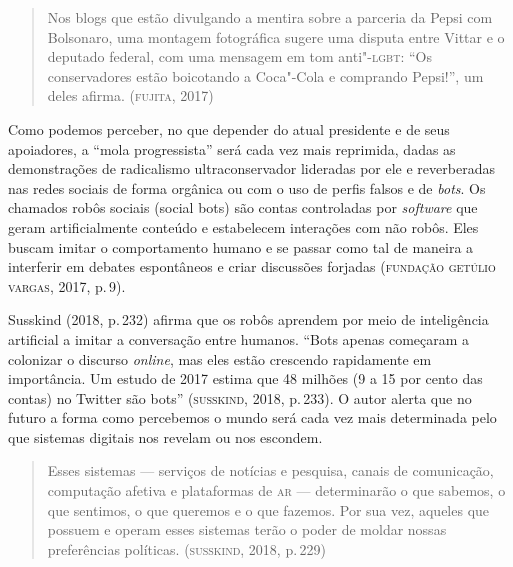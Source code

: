 \begin{quote}
Nos blogs que estão divulgando a mentira sobre a parceria da Pepsi com
Bolsonaro, uma montagem fotográfica sugere uma disputa entre Vittar e o
deputado federal, com uma mensagem em tom anti"-\textsc{lgbt}: ``Os conservadores
estão boicotando a Coca"-Cola e comprando Pepsi!'', um deles afirma.
(\textsc{fujita}, 2017)
\end{quote}

\pagebreak


Como podemos perceber, no que depender do atual presidente e de seus
apoiadores, a ``mola progressista'' será cada vez mais reprimida, dadas
as demonstrações de radicalismo ultraconservador lideradas por ele e
reverberadas nas redes sociais de forma orgânica ou com o uso de perfis
falsos e de \emph{bots}. Os chamados robôs sociais (social bots) são
contas controladas por \emph{software} que geram artificialmente conteúdo e
estabelecem interações com não robôs. Eles buscam imitar o comportamento
humano e se passar como tal de maneira a interferir em debates
espontâneos e criar discussões forjadas (\textsc{fundação getúlio vargas}, 2017,
p.\,9).

Susskind (2018, p.\,232) afirma que os robôs aprendem por meio de
inteligência artificial a imitar a conversação entre humanos. ``Bots
apenas começaram a colonizar o discurso \emph{online}, mas eles estão
crescendo rapidamente em importância. Um estudo de 2017 estima que 48
milhões (9 a 15 por cento das contas) no Twitter são bots'' (\textsc{susskind},
2018, p.\,233). O autor alerta que no futuro a forma como percebemos o
mundo será cada vez mais determinada pelo que sistemas digitais nos
revelam ou nos escondem.

\begin{quote}
Esses sistemas --- serviços de notícias e pesquisa, canais de
comunicação, computação afetiva e plataformas de \textsc{ar} --- determinarão o
que sabemos, o que sentimos, o que queremos e o que fazemos. Por sua
vez, aqueles que possuem e operam esses sistemas terão o poder de moldar
nossas preferências políticas. (\textsc{susskind}, 2018, p.\,229)
\end{quote}

